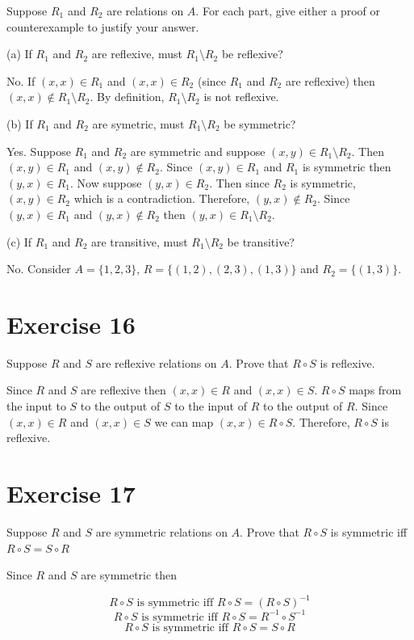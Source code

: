 \documentclass[11pt]{article}
\begin{document}
Suppose $R_1$ and $R_2$ are relations on $A$. For each part, give either a 
proof or counterexample to justify your answer.

\noindent (a) If $R_1$ and $R_2$ are reflexive, must $R_1 \setminus R_2$ be reflexive?

No. If $(x, x) \in R_1$ and $(x, x) \in R_2$ (since $R_1$ and $R_2$ are reflexive)
then $(x, x) \notin R_1 \setminus R_2$. By definition, $R_1 \setminus R_2$ is not 
reflexive.

\noindent (b) If $R_1$ and $R_2$ are symetric, must $R_1 \setminus R_2$ be symmetric?

Yes. Suppose $R_1$ and $R_2$ are symmetric and suppose $(x, y) \in R_1 \setminus R_2$.
Then $(x, y) \in R_1$ and $(x, y) \notin R_2$. Since $(x, y) \in R_1$ and $R_1$ 
is symmetric then $(y, x) \in R_1$. Now suppose $(y, x) \in R_2$. Then since $R_2$
is symmetric, $(x, y) \in R_2$ which is a contradiction. Therefore, $(y, x) \notin R_2$.
Since $(y, x) \in R_1$ and $(y, x) \notin R_2$ then $(y, x) \in R_1 \setminus R_2$.

\noindent (c) If $R_1$ and $R_2$ are transitive, must $R_1 \setminus R_2$ be transitive?

No. Consider $A = \{1, 2, 3\}$, $R = \{(1, 2), (2, 3), (1, 3)\}$ and 
$R_2 = \{(1,3)\}$.

\section*{Exercise 16}

Suppose $R$ and $S$ are reflexive relations on $A$. Prove that $R \circ S$ is 
reflexive.

Since $R$ and $S$ are reflexive then $(x, x) \in R$ and $(x, x) \in S$. 
$R \circ S$ maps from the input to $S$ to the output of $S$ to the input of $R$ 
to the output of $R$. Since $(x, x) \in R$ and $(x, x) \in S$ we can map 
$(x, x) \in R \circ S$. Therefore, $R \circ S$ is reflexive.

\section*{Exercise 17}

Suppose $R$ and $S$ are symmetric relations on $A$. Prove that $R \circ S$ is 
symmetric iff $R \circ S = S \circ R$

Since $R$ and $S$ are symmetric then

$$R \circ S \text{ is symmetric iff } R \circ S = (R \circ S)^{-1}$$ 
$$R \circ S \text{ is symmetric iff } R \circ S = R^{-1} \circ S^{-1}$$ 
$$R \circ S \text{ is symmetric iff } R \circ S = S \circ R$$ 
\end{document}
